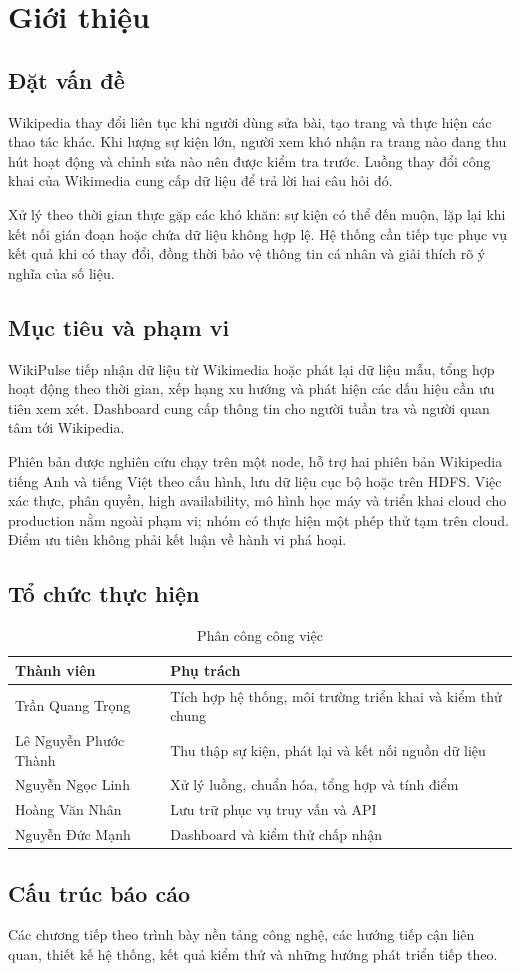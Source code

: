 \chapter{Giới thiệu}\label{chap:gioithieu}
\section{Đặt vấn đề}
Wikipedia thay đổi liên tục khi người dùng sửa bài, tạo trang và thực hiện các thao tác khác. Khi lượng sự kiện lớn, người xem khó nhận ra trang nào đang thu hút hoạt động và chỉnh sửa nào nên được kiểm tra trước. Luồng thay đổi công khai của Wikimedia cung cấp dữ liệu để trả lời hai câu hỏi đó.

Xử lý theo thời gian thực gặp các khó khăn: sự kiện có thể đến muộn, lặp lại khi kết nối gián đoạn hoặc chứa dữ liệu không hợp lệ. Hệ thống cần tiếp tục phục vụ kết quả khi có thay đổi, đồng thời bảo vệ thông tin cá nhân và giải thích rõ ý nghĩa của số liệu.
\section{Mục tiêu và phạm vi}
WikiPulse tiếp nhận dữ liệu từ Wikimedia hoặc phát lại dữ liệu mẫu, tổng hợp hoạt động theo thời gian, xếp hạng xu hướng và phát hiện các dấu hiệu cần ưu tiên xem xét. Dashboard cung cấp thông tin cho người tuần tra và người quan tâm tới Wikipedia.

Phiên bản được nghiên cứu chạy trên một node, hỗ trợ hai phiên bản Wikipedia tiếng Anh và tiếng Việt theo cấu hình, lưu dữ liệu cục bộ hoặc trên HDFS. Việc xác thực, phân quyền, high availability, mô hình học máy và triển khai cloud cho production nằm ngoài phạm vi; nhóm có thực hiện một phép thử tạm trên cloud. Điểm ưu tiên không phải kết luận về hành vi phá hoại.
\section{Tổ chức thực hiện}
\begin{table}[H]
\centering\small
\caption{Phân công công việc}\label{tab:phancong}
\begin{tabularx}{\linewidth}{@{}lX@{}}\toprule
\textbf{Thành viên} & \textbf{Phụ trách} \\ \midrule
Trần Quang Trọng & Tích hợp hệ thống, môi trường triển khai và kiểm thử chung \\
Lê Nguyễn Phước Thành & Thu thập sự kiện, phát lại và kết nối nguồn dữ liệu \\
Nguyễn Ngọc Linh & Xử lý luồng, chuẩn hóa, tổng hợp và tính điểm \\
Hoàng Văn Nhân & Lưu trữ phục vụ truy vấn và API \\
Nguyễn Đức Mạnh & Dashboard và kiểm thử chấp nhận \\
\bottomrule\end{tabularx}\end{table}
\section{Cấu trúc báo cáo}
Các chương tiếp theo trình bày nền tảng công nghệ, các hướng tiếp cận liên quan, thiết kế hệ thống, kết quả kiểm thử và những hướng phát triển tiếp theo.
